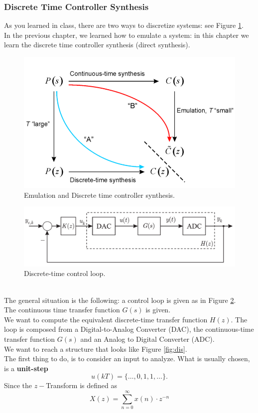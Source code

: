 \documentclass[a4paper,12 pt]{article}
\numberwithin{equation}{section}
\theoremstyle{definition}
\theoremstyle{remark}
\theoremstyle{definition}
\theoremstyle{definition}
\theoremstyle{definition}
\theoremstyle{remark}
\begin{document}
\subsubsection{Discrete Time Controller Synthesis}
As you learned in class, there are two ways to discretize systems: see Figure \ref{fig:methods}. \\
In the previous chapter, we learned how to emulate a system: in this chapter we learn the discrete time controller synthesis (direct synthesis).
\begin{figure}[h!]
\begin{center}
\includegraphics[width=0.65\columnwidth]{methods.png}
\caption{Emulation and Discrete time controller synthesis.}
\label{fig:methods}
\end{center}
\end{figure}
\begin{figure}[h!]
\begin{center}
\includegraphics[width=0.85\columnwidth]{ex_3.png}
\caption{Discrete-time control loop.}
\label{fig:ex}
\end{center}
\end{figure}
\\
The general situation is the following: a control loop is given as in Figure \ref{fig:ex}. \\ The continuous time transfer function $G(s)$ is given. \\
We want to compute the equivalent discrete-time  transfer function $H(z)$. The loop is composed from a Digital-to-Analog Converter (DAC), the continuous-time transfer function $G(s)$ and an Analog to Digital Converter (ADC). \\
We want to reach a structure that looks like Figure \ref{fig:dis}.\\
The first thing to do, is to consider an input to analyze. What is usually chosen, is a \textbf{unit-step}
\begin{equation}
u(kT)=\{\hdots,0,1,1,\hdots\}.
\end{equation}
Since the $z-$Transform is defined as
\begin{equation}
X(z)=\sum_{n=0}^\infty x(n)\cdot z^{-n}
\end{equation}
\end{document}
